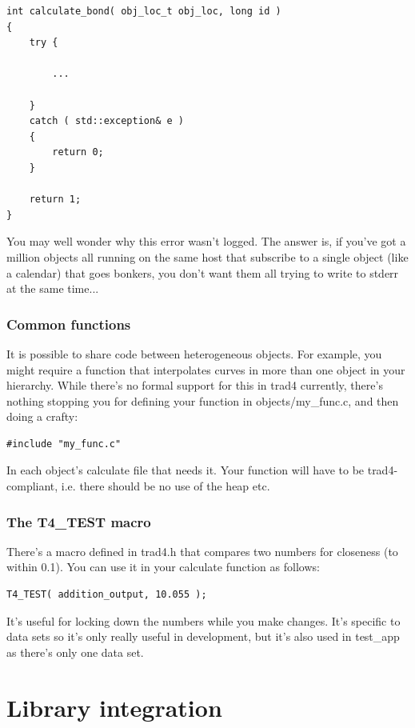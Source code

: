\documentclass{report}
\begin{document}
\begin{verbatim}
int calculate_bond( obj_loc_t obj_loc, long id )
{
    try {

        ...

    }
    catch ( std::exception& e )
    {
        return 0;
    }

    return 1;
}
\end{verbatim}

You may well wonder why this error wasn't logged. The answer is, if you've got a million objects all running on the same host that subscribe to a single object (like a calendar) that goes bonkers, you don't want them all trying to write to stderr at the same time...



\subsection{Common functions}
It is possible to share code between heterogeneous objects. For example, you might require a function that interpolates curves in more than one object in your hierarchy. While there's no formal support for this in trad4 currently, there's nothing stopping you for defining your function in objects/my_func.c, and then doing a crafty:

\begin{verbatim}
#include "my_func.c"
\end{verbatim}

In each object's calculate file that needs it. Your function will have to be trad4-compliant, i.e. there should be no use of the heap etc. 

\subsection{The T4_TEST macro}

There's a macro defined in trad4.h that compares two numbers for closeness (to within 0.1). You can use it in your calculate function as follows:

\begin{verbatim}
T4_TEST( addition_output, 10.055 );
\end{verbatim}

It's useful for locking down the numbers while you make changes. It's specific to data sets so it's only really useful in development, but it's also used in test_app as there's only one data set.

\chapter{Library integration}
\end{document}
